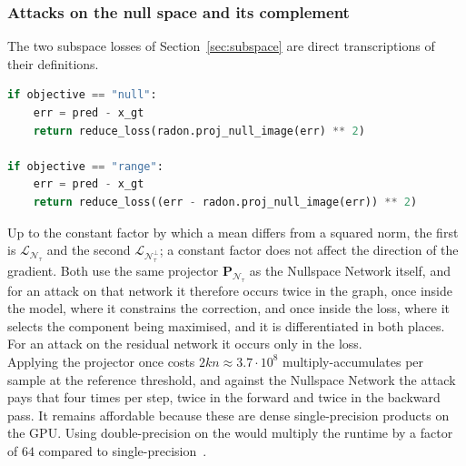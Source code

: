 \documentclass{article}
\numberwithin{equation}{section}
\begin{document}
\subsubsection{Attacks on the null space and its complement}
The two subspace losses of Section~\ref{sec:subspace} are direct transcriptions of their
definitions.
\begin{lstlisting}[language=Python, caption=The subspace objectives]
if objective == "null":
    err = pred - x_gt
    return reduce_loss(radon.proj_null_image(err) ** 2)

if objective == "range":
    err = pred - x_gt
    return reduce_loss((err - radon.proj_null_image(err)) ** 2)
\end{lstlisting}
Up to the constant factor by which a mean differs from a squared norm, the first is $\mathcal{L}_{\mathcal{N}_\tau}$ and the second
$\mathcal{L}_{\mathcal{N}_\tau^\perp}$; a constant factor does not affect the direction of the gradient.
Both use the same projector $\mathbf{P}_{\mathcal{N}_\tau}$ as the
Nullspace Network itself, and for an attack on that network it therefore occurs
twice in the graph, once inside the model, where it constrains the correction,
and once inside the loss, where it selects the component being maximised, and it is differentiated in both places.
For an attack on the residual network it occurs only in the loss.\\
Applying the projector once costs $2kn\approx3.7\cdot10^{8}$ multiply-accumulates per sample at the
reference threshold, and against the Nullspace Network the attack pays that four times per step, twice in
the forward and twice in the backward pass. It remains affordable because these are dense single-precision products on the GPU. 
Using double-precision on the would multiply the runtime by a factor of $64$ compared to single-precision~\parencite{GA102}.
\end{document}
